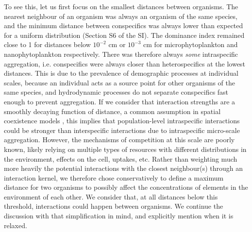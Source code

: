 \documentclass[english]{article}
\begin{document}
To see this, let us first focus on the smallest distances between
organisms. The nearest neighbour of an organism was always an organism
of the same species, and the minimum distance between conspecifics
was always lower than expected for a uniform distribution (Section
S6 of the SI). The dominance index remained close to 1 for distances
below $10^{-2}$ cm or $10^{-3}$ cm for microphytoplankton and nanophytoplankton
respectively. There was therefore always \emph{some} intraspecific
aggregation, i.e. conspecifics were always closer than heterospecifics
at the lowest distances. This is due to the prevalence of demographic
processes at individual scales, because an individual acts as a source
point for other organisms of the same species, and hydrodynamic processes
do not separate conspecifics fast enough to prevent aggregation. If
we consider that interaction strengths are a smoothly decaying function
of distance, a common assumption in spatial coexistence models \citep[e.g., ][]{bolker_spatial_1999,law_population_2003},
this implies that population-level intraspecific interactions could
be stronger than interspecific interactions due to intraspecific micro-scale
aggregation. However, the mechanisms of competition at this scale
are poorly known, likely relying on multiple types of resources with
different distributions in the environment, effects on the cell, uptakes,
etc. Rather than weighting much more heavily the potential interactions
with the closest neighbour(s) through an interaction kernel, we therefore
chose conservatively to define a maximum distance for two organisms
to possibly affect the concentrations of elements in the environment
of each other. We consider that, at all distances below this threshold,
interactions could happen between organisms. We continue the discussion
with that simplification in mind, and explicitly mention when it
is relaxed.
\end{document}
